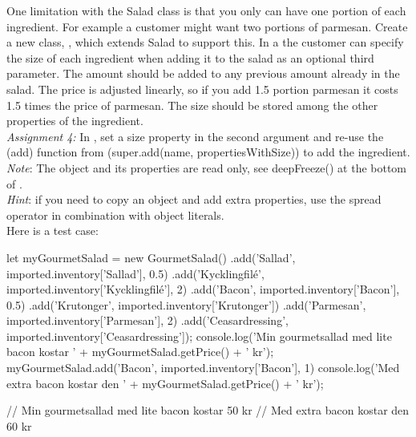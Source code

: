 \documentclass[fleqn, article, a4paper]{memoir}
\begin{document}
\begin{Assignments}
\item One limitation with the Salad class is that you only can have one portion of each ingredient. For example a customer might want two portions of parmesan. Create a new class, , which extends Salad to support this. In a  the customer can specify the size of each ingredient when adding it to the salad as an optional third parameter. The amount should be added to any previous amount already in the salad. The price is adjusted linearly, so if you add 1.5 portion parmesan it costs 1.5 times the price of parmesan. The size should be stored among the other properties of the ingredient.
\\\emph{Assignment 4:} In , set a size property in the second argument and re-use the \code(add) function from  (super.add(name, propertiesWithSize)) to add the ingredient. 
\\\emph{Note}: The  object and its properties are read only, see deepFreeze() at the bottom of .
\\\emph{Hint}: if you need to copy an object and add extra properties, use the spread operator in combination with object literals.
\\ Here is a test case:
\begin{Code}
let myGourmetSalad = new GourmetSalad()
.add('Sallad', imported.inventory['Sallad'], 0.5)
.add('Kycklingfilé', imported.inventory['Kycklingfilé'], 2)
.add('Bacon', imported.inventory['Bacon'], 0.5)
.add('Krutonger', imported.inventory['Krutonger'])
.add('Parmesan', imported.inventory['Parmesan'], 2)
.add('Ceasardressing', imported.inventory['Ceasardressing']);
console.log('Min gourmetsallad med lite bacon kostar '
    + myGourmetSalad.getPrice() + ' kr');
myGourmetSalad.add('Bacon', imported.inventory['Bacon'], 1)
console.log('Med extra bacon kostar den '
    + myGourmetSalad.getPrice() + ' kr');

// Min gourmetsallad med lite bacon kostar 50 kr
// Med extra bacon kostar den 60 kr
\end{Code}


\end{Assignments}
\end{document}
